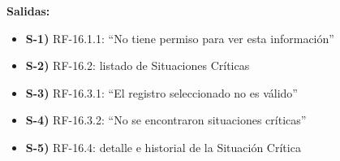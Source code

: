 \textbf{Salidas:}
\begin{itemize}[label={}, leftmargin=1.5em]
  \item \textbf{S-1)} RF-16.1.1: ``No tiene permiso para ver esta informaci\'on''
  \item \textbf{S-2)} RF-16.2: listado de Situaciones Cr\'iticas
  \item \textbf{S-3)} RF-16.3.1: ``El registro seleccionado no es v\'alido''
  \item \textbf{S-4)} RF-16.3.2: ``No se encontraron situaciones cr\'iticas''
  \item \textbf{S-5)} RF-16.4: detalle e historial de la Situaci\'on Cr\'itica
\end{itemize}
